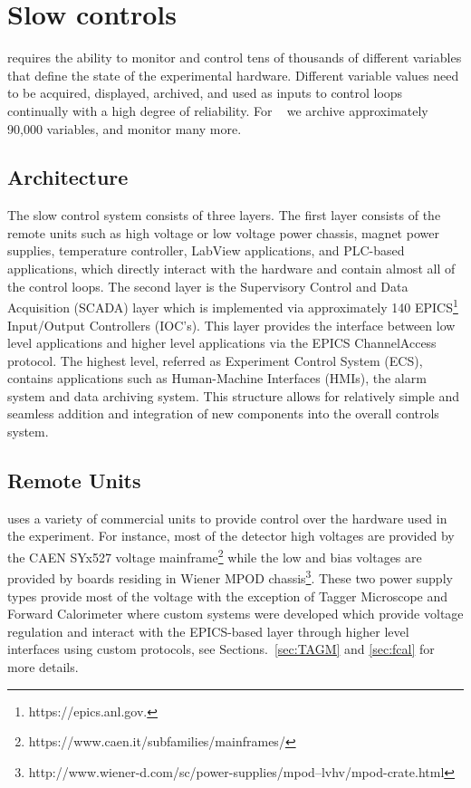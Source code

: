
\section[Slow controls]{Slow controls \label{sec:controls}}
\GX{} requires the ability to monitor 
and control tens of thousands of different variables that define the state of the experimental hardware. Different variable values need to be acquired, displayed, archived, and used as inputs to control loops continually with a high degree of reliability. For \gx~ we archive approximately 90,000 variables, and monitor many more.

\subsection{Architecture \label{sec:controlsarchitechture}}
The \gx{} slow control system consists of three layers. The first layer consists of the remote units such as high voltage or low voltage power chassis, magnet power supplies, temperature controller, LabView applications, and PLC-based applications, which directly interact with the hardware and contain almost all of the control loops. The second layer is the Supervisory Control and Data Acquisition (SCADA) layer which is implemented via approximately 140 EPICS\footnote{https://epics.anl.gov.} Input/Output Controllers (IOC's). This layer provides the interface between low level applications and higher level applications via the EPICS ChannelAccess protocol. The highest level, referred as Experiment Control System (ECS), contains applications such as Human-Machine Interfaces (HMIs), the alarm system and data archiving system. This structure allows for relatively simple and seamless addition and integration of new components into the overall controls system.    

\subsection{Remote Units \label{sec:controlsinterface}}
\gx{} uses a variety of commercial units to provide control over the hardware used in the experiment. For instance, most of the detector high voltages are provided by the CAEN SYx527 voltage mainframe\footnote{https://www.caen.it/subfamilies/mainframes/} while the low and bias voltages are provided by boards residing in Wiener MPOD chassis\footnote{http://www.wiener-d.com/sc/power-supplies/mpod--lvhv/mpod-crate.html}. These two power supply types provide most of the voltage with the exception of Tagger Microscope and Forward Calorimeter where custom systems were developed which provide voltage regulation and interact with the EPICS-based layer through higher level interfaces using custom protocols, see Sections.~\ref{sec:TAGM} and \ref{sec:fcal} for more details.  

